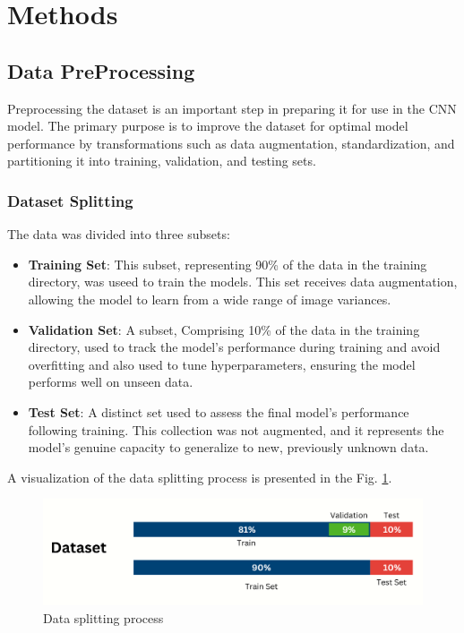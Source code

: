 \documentclass[conference]{IEEEtran}
\begin{document}
\section{Methods}
\label{sec:meth}

\subsection{Data PreProcessing}
Preprocessing the dataset is an important step in preparing it for use in the \ac{CNN} model. The primary purpose is to improve the dataset for optimal model performance by transformations such as data augmentation, standardization, and partitioning it into training, validation, and testing sets.

\subsubsection{Dataset Splitting}
The data was divided into three subsets:
\begin{itemize}
    \item \textbf{Training Set}: This subset, representing 90\% of the data in the training directory, was useed to train the models. This set receives data augmentation, allowing the model to learn from a wide range of image variances.

    \item \textbf{Validation Set}: A subset, Comprising 10\% of the data in the training directory, used to track the model's performance during training and avoid overfitting and also used to tune hyperparameters, ensuring the model performs well on unseen data. 

    \item \textbf{Test Set}: A distinct set used to assess the final model's performance following training. This collection was not augmented, and it represents the model's genuine capacity to generalize to new, previously unknown data.
\end{itemize}

A visualization of the data splitting process is presented in the Fig. \ref{fig:dataSplit}.

\begin{figure} [ht]
    \centering
    \includegraphics[width=\linewidth]{img/dataSplitting.png}
    \caption{Data splitting process}
    \label{fig:dataSplit}
\end{figure}
\end{document}
